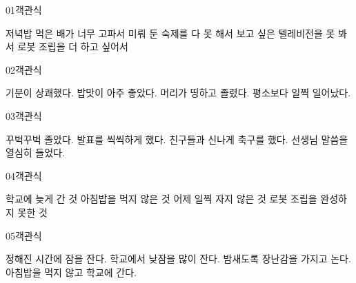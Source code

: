 \documentclass[fs13,seriesSau]{korfarm-base}
\begin{document}

\begin{kfQBlock}{01}{객관식}
\begin{kfChoices}
\kfChoice 저녁밥 먹은 배가 너무 고파서
\kfChoice 미뤄 둔 숙제를 다 못 해서
\kfChoice 보고 싶은 텔레비전을 못 봐서
\kfChoice 로봇 조립을 더 하고 싶어서
\end{kfChoices}
\end{kfQBlock}
\begin{kfQBlock}{02}{객관식}
\begin{kfChoices}
\kfChoice 기분이 상쾌했다.
\kfChoice 밥맛이 아주 좋았다.
\kfChoice 머리가 띵하고 졸렸다.
\kfChoice 평소보다 일찍 일어났다.
\end{kfChoices}
\end{kfQBlock}
\begin{kfQBlock}{03}{객관식}
\begin{kfChoices}
\kfChoice 꾸벅꾸벅 졸았다.
\kfChoice 발표를 씩씩하게 했다.
\kfChoice 친구들과 신나게 축구를 했다.
\kfChoice 선생님 말씀을 열심히 들었다.
\end{kfChoices}
\end{kfQBlock}
\begin{kfQBlock}{04}{객관식}
\begin{kfChoices}
\kfChoice 학교에 늦게 간 것
\kfChoice 아침밥을 먹지 않은 것
\kfChoice 어제 일찍 자지 않은 것
\kfChoice 로봇 조립을 완성하지 못한 것
\end{kfChoices}
\end{kfQBlock}
\begin{kfQBlock}{05}{객관식}
\begin{kfChoices}
\kfChoice 정해진 시간에 잠을 잔다.
\kfChoice 학교에서 낮잠을 많이 잔다.
\kfChoice 밤새도록 장난감을 가지고 논다.
\kfChoice 아침밥을 먹지 않고 학교에 간다.
\end{kfChoices}
\end{kfQBlock}


\end{document}
